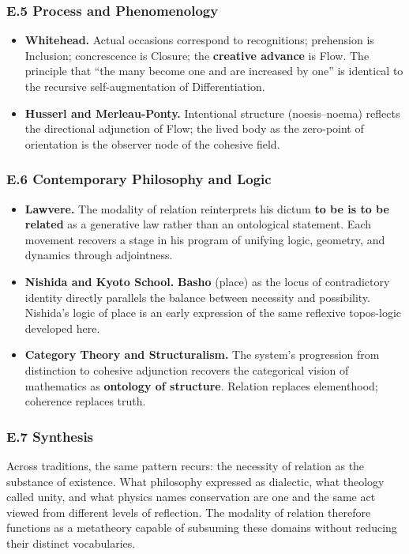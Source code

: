 \documentclass[11pt]{article}
\begin{document}
\subsubsection*{E.5 Process and Phenomenology}
\label{sec:org7b25c54}
\begin{itemize}
\item \textbf{\textbf{Whitehead.}}  
Actual occasions correspond to recognitions;  
prehension is Inclusion; concrescence is Closure;  
the \textbf{creative advance} is Flow.  
The principle that “the many become one and are increased by one”  
is identical to the recursive self-augmentation of Differentiation.

\item \textbf{\textbf{Husserl and Merleau-Ponty.}}  
Intentional structure (noesis–noema) reflects  
the directional adjunction of Flow;  
the lived body as the zero-point of orientation  
is the observer node of the cohesive field.
\end{itemize}
\subsubsection*{E.6 Contemporary Philosophy and Logic}
\label{sec:org5040bf7}
\begin{itemize}
\item \textbf{\textbf{Lawvere.}}  
The modality of relation reinterprets his dictum \textbf{to be is to be related}  
as a generative law rather than an ontological statement.  
Each movement recovers a stage in his program of  
unifying logic, geometry, and dynamics through adjointness.

\item \textbf{\textbf{Nishida and Kyoto School.}}  
\textbf{Basho} (place) as the locus of contradictory identity  
directly parallels the balance between necessity and possibility.  
Nishida’s logic of place is an early expression  
of the same reflexive topos-logic developed here.

\item \textbf{\textbf{Category Theory and Structuralism.}}  
The system’s progression from distinction to cohesive adjunction  
recovers the categorical vision of mathematics as \textbf{ontology of structure}.  
Relation replaces elementhood; coherence replaces truth.
\end{itemize}
\subsubsection*{E.7 Synthesis}
\label{sec:org2a8c7fb}
Across traditions, the same pattern recurs:  
the necessity of relation as the substance of existence.  
What philosophy expressed as dialectic, what theology called unity,  
and what physics names conservation  
are one and the same act viewed from different levels of reflection.  
The modality of relation therefore functions as a metatheory  
capable of subsuming these domains without reducing their distinct vocabularies.
\end{document}
